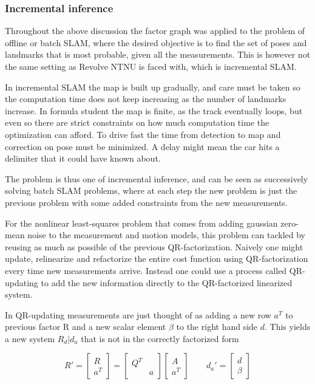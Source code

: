 \subsubsection{Incremental inference}

Throughout the above discussion the factor graph was applied to the problem of offline or batch SLAM, where the desired objective is to find the set of poses and landmarks that is most probable, given all the measurements. This is however not the same setting as Revolve NTNU is faced with, which is incremental SLAM.

In incremental SLAM the map is built up gradually, and care must be taken so the computation time does not keep increasing as the number of landmarks increase. In formula student the map is finite, as the track eventually loops, but even so there are strict constraints on how much computation time the optimization can afford. To drive fast the time from detection to map and correction on pose must be minimized. A delay might mean the car hits a delimiter that it could have known about.

The problem is thus one of incremental inference, and can be seen as successively solving batch SLAM problems, where at each step the new problem is just the previous problem with some added constraints from the new measurements.

For the nonlinear least-squares problem that comes from adding gaussian zero-mean noise to the measurement and motion models, this problem can tackled by reusing as much as possible of the previous QR-factorization. Naively one might update, relinearize and refactorize the entire cost function using QR-factorization every time new measurements arrive. Instead one could use a process called QR-updating to add the new information directly to the QR-factorized linearized system. 

In QR-updating measurements are just thought of as adding a new row $a^T$ to previous factor R and a new scalar element $\beta$ to the right hand side $d$. This yields a new system $R_d|d_a$ that is not in the correctly factorized form

\begin{equation}
    R' = \begin{bmatrix} R \\ a^T \end{bmatrix}=\begin{bmatrix} Q^T &  \\ & a \end{bmatrix}\begin{bmatrix} A \\ a^T \end{bmatrix} \quad \quad d_a' = \begin{bmatrix} d \\ \beta  \end{bmatrix}
\end{equation}

